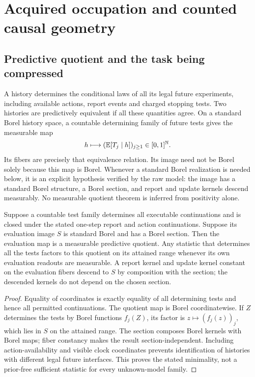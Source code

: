 \section{Acquired occupation and counted causal geometry}\label{sec:geometry}
\subsection{Predictive quotient and the task being compressed}
A history determines the conditional laws of all its legal future experiments, including available actions, report events and charged stopping tests. Two histories are predictively equivalent if all these quantities agree. On a standard Borel history space, a countable determining family of future tests gives the measurable map
\[
 h\longmapsto (\mathbb E[T_j\mid h])_{j\ge1}\in[0,1]^{\mathbb N}.
\]
Its fibers are precisely that equivalence relation. Its image need not be Borel solely because this map is Borel. Whenever a standard Borel realization is needed below, it is an explicit hypothesis verified by the raw model: the image has a standard Borel structure, a Borel section, and report and update kernels descend measurably. No measurable quotient theorem is inferred from positivity alone.

\begin{lemma}\label{lem:quotient}
Suppose a countable test family determines all executable continuations and is closed under the stated one-step report and action continuations. Suppose its evaluation image $S$ is standard Borel and has a Borel section. Then the evaluation map is a measurable predictive quotient. Any statistic that determines all the tests factors to this quotient on its attained range whenever its own evaluation readouts are measurable. A report kernel and update kernel constant on the evaluation fibers descend to $S$ by composition with the section; the descended kernels do not depend on the chosen section.
\end{lemma}
\begin{proof}
Equality of coordinates is exactly equality of all determining tests and hence all permitted continuations. The quotient map is Borel coordinatewise. If $Z$ determines the tests by Borel functions $f_j(Z)$, its factor is $z\mapsto(f_j(z))_j$, which lies in $S$ on the attained range. The section composes Borel kernels with Borel maps; fiber constancy makes the result section-independent. Including action-availability and visible clock coordinates prevents identification of histories with different legal future interfaces. This proves the stated minimality, not a prior-free sufficient statistic for every unknown-model family.
\end{proof}

